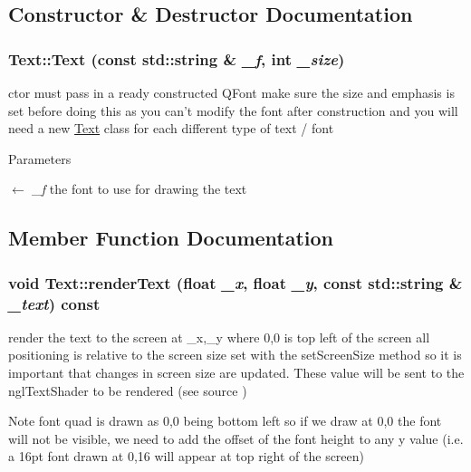\subsection{Constructor \& Destructor Documentation}
\hypertarget{classText_a5454ef14fc670f5ef68bdbe2fe2fad3b}{
\subsubsection[{Text}]{\setlength{\rightskip}{0pt plus 5cm}Text::Text (const std::string \& {\em \_\-f}, \/  int {\em \_\-size})}}
\label{classText_a5454ef14fc670f5ef68bdbe2fe2fad3b}


ctor must pass in a ready constructed QFont make sure the size and emphasis is set before doing this as you can't modify the font after construction and you will need a new \hyperlink{classText}{Text} class for each different type of text / font 
\begin{DoxyParams}{Parameters}
\item[\mbox{$\leftarrow$} {\em \_\-f}]the font to use for drawing the text \end{DoxyParams}


\subsection{Member Function Documentation}
\hypertarget{classText_a3d0591d0b3a6bd73543cb8637fbe91e5}{
\subsubsection[{renderText}]{\setlength{\rightskip}{0pt plus 5cm}void Text::renderText (float {\em \_\-x}, \/  float {\em \_\-y}, \/  const std::string \& {\em \_\-text}) const}}
\label{classText_a3d0591d0b3a6bd73543cb8637fbe91e5}


render the text to the screen at \_\-x,\_\-y where 0,0 is top left of the screen all positioning is relative to the screen size set with the setScreenSize method so it is important that changes in screen size are updated. These value will be sent to the nglTextShader to be rendered (see source ) \begin{DoxyNote}{Note}
font quad is drawn as 0,0 being bottom left so if we draw at 0,0 the font will not be visible, we need to add the offset of the font height to any y value (i.e. a 16pt font drawn at 0,16 will appear at top right of the screen) 
\end{DoxyNote}

